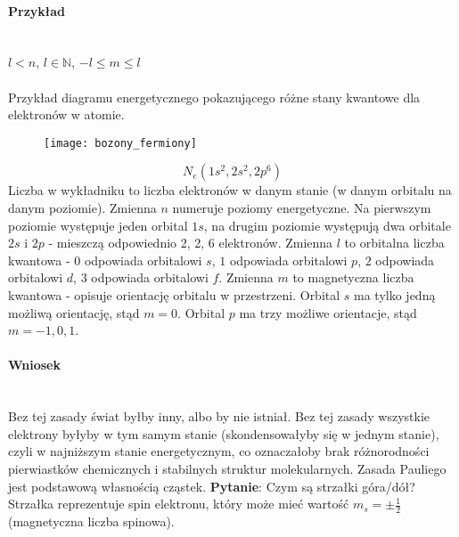 \paragraph*{Przykład}\mbox{}\\
%
$l < n$, $l \in \mathbb{N}$, $-l \leq m \leq l$
%
\\ \\
%
Przykład diagramu energetycznego pokazującego różne stany kwantowe dla elektronów w atomie.
\begin{figure}[H]
    \centering
    \texttt{[image: bozony\_fermiony]}
    \label{fig:bozony_fermiony}
\end{figure}
\begin{equation*}
    N_e(1s^2, 2s^2, 2p^6)
\end{equation*}
Liczba w wykładniku to liczba elektronów w danym stanie (w danym orbitalu na danym poziomie). Zmienna $n$ numeruje poziomy energetyczne. Na pierwszym
poziomie występuje jeden orbital $1s$, na drugim poziomie występują dwa orbitale $2s$ i $2p$ - mieszczą odpowiednio 2, 2, 6 elektronów. Zmienna $l$ to
orbitalna liczba kwantowa - $0$ odpowiada orbitalowi $s$, $1$ odpowiada orbitalowi $p$, $2$ odpowiada orbitalowi $d$, $3$ odpowiada orbitalowi $f$.
Zmienna $m$ to magnetyczna liczba kwantowa - opisuje orientację orbitalu w przestrzeni. Orbital $s$ ma tylko jedną możliwą orientację,
stąd $m = 0$. Orbital $p$ ma trzy możliwe orientacje, stąd $m = -1, 0, 1$.
\paragraph*{Wniosek}\mbox{}\\
Bez tej zasady świat byłby inny, albo by nie istniał. Bez tej zasady wszystkie elektrony byłyby w tym samym stanie (skondensowałyby się w jednym stanie),
czyli w najniższym stanie energetycznym, co oznaczałoby brak różnorodności pierwiastków chemicznych i stabilnych struktur molekularnych.
%
Zasada Pauliego jest podstawową własnością cząstek.
%
\textbf{Pytanie}: Czym są strzałki góra/dół? Strzałka reprezentuje spin elektronu, który może mieć wartość $m_s = \pm \frac{1}{2}$ (magnetyczna liczba spinowa).
